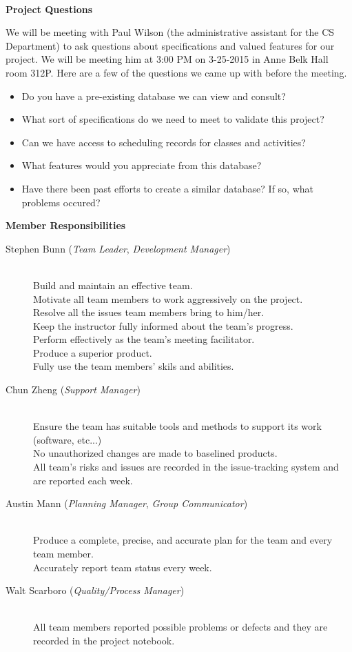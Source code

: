 \documentclass{article}
\begin{document}
\\\hline
\begin{center}\textbf{\large Project Questions}\end{center}
We will be meeting with Paul Wilson (the administrative assistant for the CS Department) to ask questions about specifications and valued features for our project. We will be meeting him at 3:00 PM on 3-25-2015 in Anne Belk Hall room 312P. Here are a few of the questions we came up with before the meeting.
\begin{itemize}
    \item Do you have a pre-existing database we can view and consult?
    \item What sort of specifications do we need to meet to validate this project?
    \item Can we have access to scheduling records for classes and activities?
    \item What features would you appreciate from this database?
    \item Have there been past efforts to create a similar database? If so, what problems occured?
\end{itemize}
\newpage
\begin{center}\textbf{\large Member Responsibilities}\end{center}
\begin{description}
    \item[Stephen Bunn (\emph{Team Leader}, \emph{Development Manager})] \hfill\\ Build and maintain an effective team.\\Motivate all team members to work aggressively on the project.\\Resolve all the issues team members bring to him/her.\\Keep the instructor fully informed about the team's progress.\\Perform effectively as the team's meeting facilitator.\\Produce a superior product.\\Fully use the team members' skils and abilities.
    \item[Chun Zheng (\emph{Support Manager})] \hfill\\ Ensure the team has suitable tools and methods to support its work (software, etc...)\\No unauthorized changes are made to baselined products.\\All team's risks and issues are recorded in the issue-tracking system and are reported each week.
    \item[Austin Mann (\emph{Planning Manager}, \emph{Group Communicator})] \hfill\\ Produce a complete, precise, and accurate plan for the team and every team member.\\Accurately report team status every week.
    \item[Walt Scarboro (\emph{Quality/Process Manager})] \hfill\\ All team members reported possible problems or defects and they are recorded in the project notebook.
\end{description}
\end{document}
